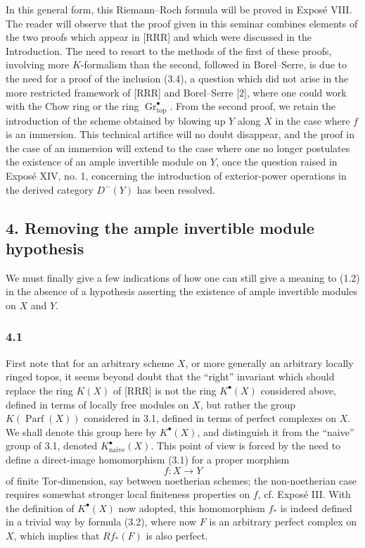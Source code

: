 \documentclass[11pt]{article}
\newcommand{\Gr}{\operatorname{Gr}}
\newcommand{\Parf}{\operatorname{Parf}}
\providecommand{\Gr}{\operatorname{Gr}}
\providecommand{\Gr}{\operatorname{G}}
\begin{document}
In this general form, this Riemann--Roch formula will be proved in Expos\'e VIII. The reader will observe that the proof given in this seminar combines elements of the two proofs which appear in [RRR] and which were discussed in the Introduction. The need to resort to the methods of the first of these proofs, involving more $K$-formalism than the second, followed in Borel--Serre, is due to the need for a proof of the inclusion (3.4), a question which did not arise in the more restricted framework of [RRR] and Borel--Serre [2], where one could work with the Chow ring or the ring $\Gr^\bullet_{\mathrm{top}}$. From the second proof, we retain the introduction of the scheme obtained by blowing up $Y$ along $X$ in the case where $f$ is an immersion. This technical artifice will no doubt disappear, and the proof in the case of an immersion will extend to the case where one no longer postulates the existence of an ample invertible module on $Y$, once the question raised in Expos\'e XIV, no. 1, concerning the introduction of exterior-power operations in the derived category $D^-(Y)$ has been resolved.

\subsection*{4. Removing the ample invertible module hypothesis}
We must finally give a few indications of how one can still give a meaning to (1.2) in the absence of a hypothesis asserting the existence of ample invertible modules on $X$ and $Y$.

\subsubsection*{4.1}
First note that for an arbitrary scheme $X$, or more generally an arbitrary locally ringed topos, it seems beyond doubt that the ``right'' invariant which should replace the ring $K(X)$ of [RRR] is not the ring $K^\bullet(X)$ considered above, defined in terms of locally free modules on $X$, but rather the group $K(\Parf(X))$ considered in 3.1, defined in terms of perfect complexes on $X$. We shall denote this group here by $K^\bullet(X)$, and distinguish it from the ``naive'' group of 3.1, denoted $K^\bullet_{\mathrm{naive}}(X)$. This point of view is forced by the need to define a direct-image homomorphism (3.1) for a proper morphism
\[
f:X\longrightarrow Y
\]
of finite Tor-dimension, say between noetherian schemes; the non-noetherian case requires somewhat stronger local finiteness properties on $f$, cf. Expos\'e III. With the definition of $K^\bullet(X)$ now adopted, this homomorphism $f_*$ is indeed defined in a trivial way by formula (3.2), where now $F$ is an arbitrary perfect complex on $X$, which implies that $Rf_*(F)$ is also perfect.
\end{document}
